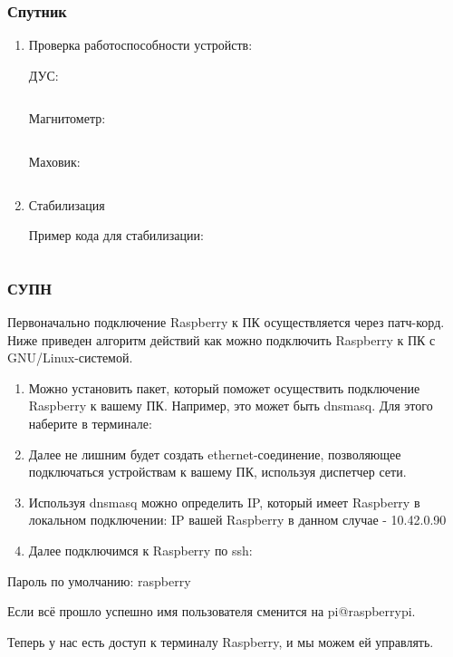 \solutionSection

\subsubsection*{Спутник}

\begin{enumerate}
    \item Проверка работоспособности устройств:
    
    ДУС:

\inputminted[fontsize=\footnotesize, linenos]{python}{final/command_tour/dzz/task_01/source_1.py}

    Магнитометр:

\inputminted[fontsize=\footnotesize, linenos]{python}{final/command_tour/dzz/task_01/source_2.py}

    Маховик:

\inputminted[fontsize=\footnotesize, linenos]{python}{final/command_tour/dzz/task_01/source_3.py}

    \item Стабилизация

    Пример кода для стабилизации:

\inputminted[fontsize=\footnotesize, linenos]{python}{final/command_tour/dzz/task_01/source_4.py}

\end{enumerate}

\subsubsection*{СУПН}

Первоначально подключение Raspberry к ПК осуществляется через патч-корд. Ниже приведен алгоритм действий как можно подключить Raspberry к ПК с GNU/Linux-системой.

\begin{enumerate}
    \item Можно установить пакет, который поможет осуществить подключение Raspberry к вашему ПК. Например, это может быть dnsmasq. Для этого наберите в терминале:
    \item Далее не лишним будет создать ethernet-соединение, позволяющее подключаться устройствам к вашему ПК, используя диспетчер сети.
    \item Используя dnsmasq можно определить IP, который имеет Raspberry в локальном подключении:
    IP вашей Raspberry в данном случае - 10.42.0.90
    \item Далее подключимся к Raspberry по ssh:
\end{enumerate}

Пароль по умолчанию: raspberry

Если всё прошло успешно имя пользователя сменится на pi@raspberrypi.

Теперь у нас есть доступ к терминалу Raspberry, и мы можем ей управлять.
 
